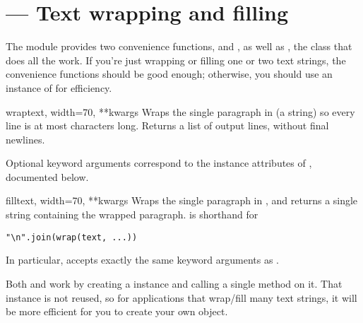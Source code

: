 \section{ ---
         Text wrapping and filling}



The  module provides two convenience functions,
 and , as well as
, the class that does all the work.  If you're just
wrapping or filling one or two text strings, the convenience functions
should be good enough; otherwise, you should use an instance of
 for efficiency.

\begin{funcdesc}{wrap}{text, width=70, **kwargs}
Wraps the single paragraph in  (a string) so every line is at
most  characters long.  Returns a list of output lines,
without final newlines.

Optional keyword arguments correspond to the instance attributes of
, documented below.
\end{funcdesc}

\begin{funcdesc}{fill}{text, width=70, **kwargs}
Wraps the single paragraph in , and returns a single string
containing the wrapped paragraph.   is shorthand for
\begin{verbatim}
"\n".join(wrap(text, ...))
\end{verbatim}

In particular,  accepts exactly the same keyword
arguments as .
\end{funcdesc}

Both  and  work by creating a
 instance and calling a single method on it.  That
instance is not reused, so for applications that wrap/fill many text
strings, it will be more efficient for you to create your own
 object.


